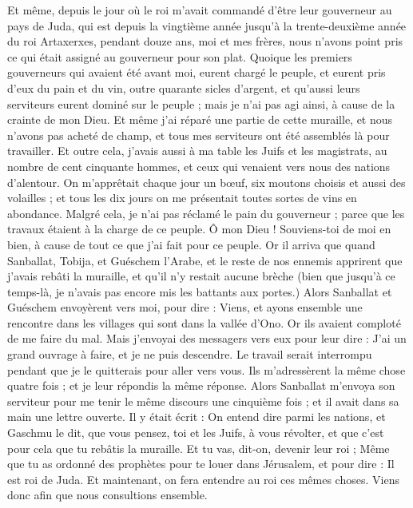 \begin{multicols}{2}
Et même, depuis le jour où le roi m'avait commandé d'être leur gouverneur au pays de Juda, qui est depuis la vingtième année jusqu'à la trente-deuxième année du roi Artaxerxes, pendant douze ans, moi et mes frères, nous n'avons point pris ce qui était assigné au gouverneur pour son plat.
Quoique les premiers gouverneurs qui avaient été avant moi, eurent chargé le peuple, et eurent pris d'eux du pain et du vin, outre quarante sicles d'argent, et qu'aussi leurs serviteurs eurent dominé sur le peuple ; mais je n'ai pas agi ainsi, à cause de la crainte de mon Dieu.
Et même j'ai réparé une partie de cette muraille, et nous n'avons pas acheté de champ, et tous mes serviteurs ont été assemblés là pour travailler.
Et outre cela, j'avais aussi à ma table les Juifs et les magistrats, au nombre de cent cinquante hommes, et ceux qui venaient vers nous des nations d'alentour.
On m'apprêtait chaque jour un bœuf, six moutons choisis et aussi des volailles ; et tous les dix jours on me présentait toutes sortes de vins en abondance. Malgré cela, je n'ai pas réclamé le pain du gouverneur ; parce que les travaux étaient à la charge de ce peuple.
Ô mon Dieu ! Souviens-toi de moi en bien, à cause de tout ce que j'ai fait pour ce peuple.
\VerseOne{}Or il arriva que quand Sanballat, Tobija, et Guéschem l'Arabe, et le reste de nos ennemis apprirent que j'avais rebâti la muraille, et qu'il n'y restait aucune brèche (bien que jusqu'à ce temps-là, je n'avais pas encore mis les battants aux portes.)
Alors Sanballat et Guéschem envoyèrent vers moi, pour dire : Viens, et ayons ensemble une rencontre dans les villages qui sont dans la vallée d'Ono. Or ils avaient comploté de me faire du mal.
Mais j'envoyai des messagers vers eux pour leur dire : J'ai un grand ouvrage à faire, et je ne puis descendre. Le travail serait interrompu pendant que je le quitterais pour aller vers vous.
Ils m'adressèrent la même chose quatre fois ; et je leur répondis la même réponse.
Alors Sanballat m'envoya son serviteur pour me tenir le même discours une cinquième fois ; et il avait dans sa main une lettre ouverte.
Il y était écrit : On entend dire parmi les nations, et Gaschmu le dit, que vous pensez, toi et les Juifs, à vous révolter, et que c'est pour cela que tu rebâtis la muraille. Et tu vas, dit-on, devenir leur roi ;
Même que tu as ordonné des prophètes pour te louer dans Jérusalem, et pour dire : Il est roi de Juda. Et maintenant, on fera entendre au roi ces mêmes choses. Viens donc afin que nous consultions ensemble.

\end{multicols}
